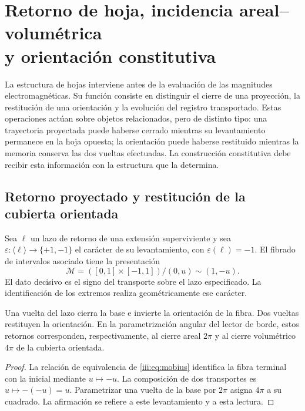 \section[Retorno de hoja, incidencia areal--volumétrica y orientación constitutiva]{Retorno de hoja, incidencia areal--volumétrica\\y orientación constitutiva}
\label{iii:sec:hojas}

La estructura de hojas interviene antes de la evaluación de las magnitudes
electromagnéticas. Su función consiste en distinguir el cierre de una proyección,
la restitución de una orientación y la evolución del registro transportado.
Estas operaciones actúan sobre objetos relacionados, pero de distinto tipo: una
trayectoria proyectada puede haberse cerrado mientras su levantamiento permanece
en la hoja opuesta; la orientación puede haberse restituido mientras la memoria
conserva las dos vueltas efectuadas. La construcción constitutiva debe recibir
esta información con la estructura que la determina.

\subsection{Retorno proyectado y restitución de la cubierta orientada}

Sea $\ell$ un lazo de retorno de una extensión superviviente y sea
$\varepsilon:\langle\ell\rangle\to\{+1,-1\}$ el carácter de su
levantamiento, con $\varepsilon(\ell)=-1$. El fibrado de intervalos asociado
tiene la presentación
\begin{equation}
 \mathcal M=([0,1]\times[-1,1])/{(0,u)\sim(1,-u)}.
 \label{iii:eq:mobius}
\end{equation}
El dato decisivo es el signo del transporte sobre el lazo especificado. La
identificación de los extremos realiza geométricamente ese carácter.

\begin{proposition}
Una vuelta del lazo cierra la base e invierte la orientación de la fibra. Dos
vueltas restituyen la orientación. En la parametrización angular del lector de
borde, estos retornos corresponden, respectivamente, al cierre areal $2\pi$ y
al cierre volumétrico $4\pi$ de la cubierta orientada.
\end{proposition}
\begin{proof}
La relación de equivalencia de \eqref{iii:eq:mobius} identifica la fibra terminal
con la inicial mediante $u\mapsto-u$. La composición de dos transportes es
$u\mapsto-(-u)=u$. Parametrizar una vuelta de la base por $2\pi$ asigna $4\pi$
a su cuadrado. La afirmación se refiere a este levantamiento y a esta lectura.
\end{proof}

